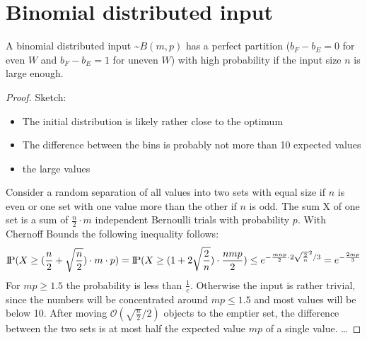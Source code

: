 \section{Binomial distributed input}
\begin{lemma}\label{lemma:BinomialSolvable}
    A binomial distributed input \textasciitilde$B(m,p)$ has a perfect partition ($b_F - b_E = 0$ for even $W$ and $b_F - b_E = 1$ for uneven $W$) with high probability if the input size $n$ is large enough.
\end{lemma}
\begin{proof}
    Sketch:
    \begin{itemize}
        \item The initial distribution is likely rather close to the optimum
        \item The difference between the bins is probably not more than 10 expected values
        \item the large values
    \end{itemize}
    Consider a random separation of all values into two sets with equal size if $n$ is even or one set with one value more than the other if $n$ is odd. The sum X of one set is a sum of $\frac{n}{2}\cdot m$ independent Bernoulli trials with probability $p$. With Chernoff Bounds the following inequality follows:
    \[\text{I\kern-0.15em P}(X\ge(\frac{n}{2}+\sqrt{\frac{n}{2}})\cdot m \cdot p) = \text{I\kern-0.15em P}(X\ge(1+2\sqrt{\frac{2}{n}})\cdot \frac{nmp}{2}) \le e^{-\frac{mnp}{2}\cdot2\sqrt{\frac{2}{n}}^2 /3} = e^{-\frac{2mp}{3}}\]
    For $mp\ge1.5$ the probability is less than $\frac{1}{e}$. Otherwise the input is rather trivial, since the numbers will be concentrated around $mp\le1.5$ and most values will be below 10.\newline
    After moving $\mathcal{O}(\sqrt{\frac{n}{2}}/2)$ objects to the emptier set, the difference between the two sets is at most half the expected value $mp$ of a single value.
    \dots
\end{proof}


